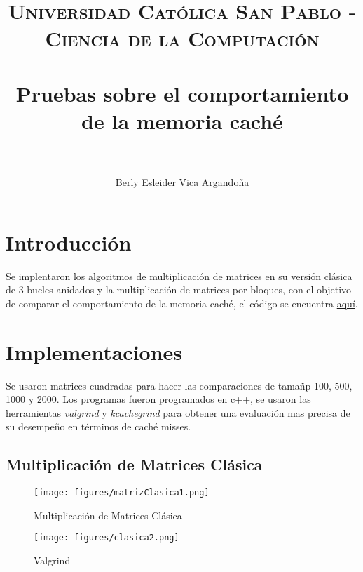 \documentclass[paper=a4, fontsize=11pt]{scrartcl}
\title{
		\usefont{OT1}{bch}{b}{n}
		\normalfont \normalsize \textsc{Universidad Católica San Pablo - Ciencia de la Computación} \\ [25pt]
		\horrule{0.5pt} \\[0.4cm]
		\huge Pruebas sobre el comportamiento de la memoria caché \\
		\horrule{2pt} \\[0.5cm]
}
\author{Berly Esleider Vica Argandoña}
\date{}
\numberwithin{equation}{section}		%
\numberwithin{figure}{section}			%
\numberwithin{table}{section}				%
\begin{document}
\maketitle
\section{Introducción}
Se implentaron los algoritmos de multiplicación de matrices en su versión clásica de 3 bucles anidados y la multiplicación de matrices por bloques, con el objetivo de comparar el comportamiento de la memoria caché, el código se encuentra \href{https://github.com/TKgitmode/Paralela/tree/main/Laboratorio1}{aquí}.

\section{Implementaciones}
Se usaron matrices cuadradas para hacer las comparaciones de tamañp 100, 500, 1000 y 2000. Los programas fueron programados en c++, se usaron las herramientas \textit{valgrind} y \textit{kcachegrind} para obtener una evaluación mas precisa de su desempeño en términos de caché misses.
\subsection{Multiplicación de Matrices Clásica}

\begin{comment}
\begin{itemize}
    \item Filtro: Aquello que discrimina elementos indeseables de un conjunto. En sistemas de control, un filtro es aquel que discrimina determinadas frecuencias de una señal eléctrica que pasa por él.
    \item Proceso: conjunto de actividades que se realizan bajo ciertas circunstancias y con un fin determinado.
\end{itemize}
\end{comment}

\begin{figure}[!h]
  \centering
  \texttt{[image: figures/matrizClasica1.png]}
  \caption{Multiplicación de Matrices Clásica}
  \label{fig:1}
\end{figure}

\begin{figure}[!h]
  \centering
  \texttt{[image: figures/clasica2.png]}
  \caption{Valgrind}
  \label{fig:2}
\end{figure}
\end{document}
